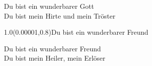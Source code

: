 \documentclass[aspectratio=169]{beamer}
\begin{document}
\begin{frame}
\centering
\color{white}
\huge{Du bist ein wunderbarer Gott} \\
\huge{Du bist mein Hirte und mein Tröster} \\

\begin{textblock}{1.0}(0.00001,0.8)\color{gray}\normalsize{Du bist ein wunderbarer Freund}\end{textblock}
\end{frame}

\begin{frame}
\centering
\color{white}
\huge{Du bist ein wunderbarer Freund} \\
\huge{Du bist mein Heiler, mein Erlöser} \\
\end{frame}
\end{document}
